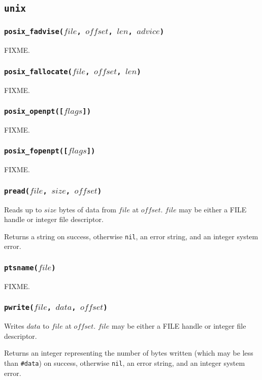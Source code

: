 \documentclass[11pt, oneside]{memoir}
\newcommand*{\nil}[0]{\texttt{nil}\xspace}
\newcommand*{\fn}[1]{\texttt{#1}\xspace}
\newcommand*{\otherwise}[1]{otherwise #1, an error string, and an integer system error}
\newcounter{toccols}
\newenvironment{Module}[1]{
	\subsection{\texttt{#1}}
	\addtocontents{toc}{
		\protect\begin{multicols}{\value{toccols}}
	}
}{
	\addtocontents{toc}{\protect\end{multicols}}
}
\begin{document}
\begin{Module}{unix}
\subsubsection[\fn{posix\_fadvise}]{\fn{posix\_fadvise($file$, $offset$, $len$, $advice$)}}

FIXME.

\subsubsection[\fn{posix\_fallocate}]{\fn{posix\_fallocate($file$, $offset$, $len$)}}

FIXME.

\subsubsection[\fn{posix\_openpt}]{\fn{posix\_openpt([$flags$])}}

FIXME.

\subsubsection[\fn{posix\_fopenpt}]{\fn{posix\_fopenpt([$flags$])}}

FIXME.

\subsubsection[\fn{pread}]{\fn{pread($file$, $size$, $offset$)}}

Reads up to $size$ bytes of data from $file$ at $offset$. $file$ may be either a FILE handle or integer file descriptor.

Returns a string on success, \otherwise{\nil}.

\subsubsection[\fn{ptsname}]{\fn{ptsname($file$)}}

FIXME.

\subsubsection[\fn{pwrite}]{\fn{pwrite($file$, $data$, $offset$)}}

Writes $data$ to $file$ at $offset$. $file$ may be either a FILE handle or integer file descriptor.

Returns an integer representing the number of bytes written (which may be less than \texttt{\#data}) on success, \otherwise{\nil}.


\end{Module}
\end{document}
